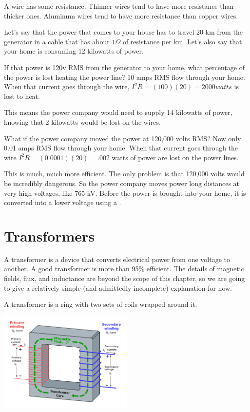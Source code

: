 A wire has some resistance. Thinner wires tend to have more resistance
than thicker ones. Aluminum wires tend to have more resistance than
copper wires.

Let's say that the power that comes to your house has to travel 20 km
from the generator in a cable that has about $1 \Omega$ of resistance
per km.  Let's also say that your home is consuming 12 kilowatts of power.

If that power is 120v RMS from the generator to your home, what
percentage of the power is lost heating the power line? 10 amps RMS
flow through your home. When that current goes through the wire, $I^2
R = (100)(20) = 2000 watts$ is lost to heat.

This means the power company would need to supply 14 kilowatts of power,
knowing that 2 kilowatts would be lost on the wires.

What if the power company moved the power at 120,000 volts RMS? Now
only 0.01 amps RMS flow through your home. When that current goes
through the wire $I^2R = (0.0001)(20) = .002$ watts of power are lost
on the power lines.

This is much, much more efficient. The only problem is that 120,000 volts
would be incredibly dangerous.  So the power company moves power long
distances at very high voltages, like 765 kV.  Before the power is
brought into your home, it is converted into a lower voltage using a
.

\section{Transformers}

A transformer is a device that converts electrical power from one
voltage to another. A good transformer is more than 95\% efficient. The
details of magnetic fields, flux, and inductance are beyond the scope
of this chapter, so we are going to give a relatively simple (and admittedly incomplete) explanation for now.

A transformer is a ring with two sets of coils wrapped around it.

\includegraphics[width=0.5\textwidth]{transformer.png}

